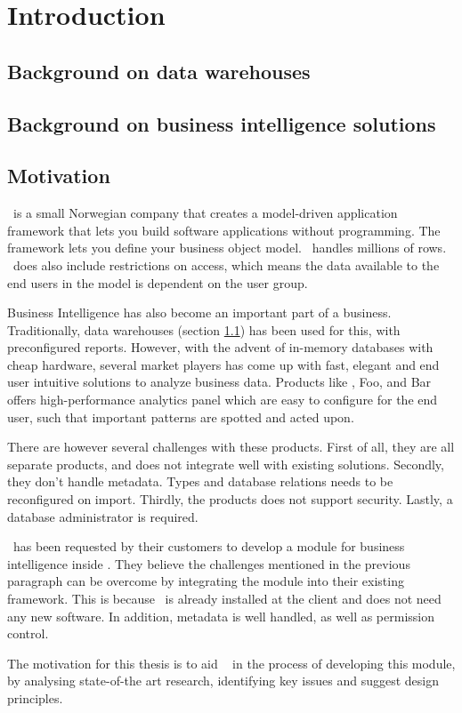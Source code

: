 \chapter{Introduction}
\label{chap:introduction}

\section{Background on data warehouses}
\label{sec:background-data-warehouses}
\lipsum[3]

\section{Background on business intelligence solutions}
\lipsum[3]

\section{Motivation}
\genus~is a small Norwegian company that creates a model-driven application framework that lets you build software applications without programming. The framework lets you define your business object model. \genusSoftware~handles millions of rows. \genusSoftware~does also include restrictions on access, which means the data available to the end users in the model is dependent on the user group.

Business Intelligence has also become an important part of a business. Traditionally, data warehouses (section \ref{sec:background-data-warehouses}) has been used for this, with preconfigured reports. However, with the advent of in-memory databases with cheap hardware, several market players has come up with fast, elegant and end user intuitive solutions to analyze business data. Products like \qlikview, Foo, and Bar offers high-performance analytics panel which are easy to configure for the end user, such that important patterns are spotted and acted upon.

There are however several challenges with these products. First of all, they are all separate products, and does not integrate well with existing solutions. Secondly, they don't handle metadata. Types and database relations needs to be reconfigured on import. Thirdly, the products does not support security. Lastly, a database administrator is required.

\genus~has been requested by their customers to develop a module for business intelligence inside \genusSoftware . They believe the challenges mentioned in the previous paragraph can be overcome by integrating the module into their existing framework. This is because \genusSoftware~is already installed at the client and does not need any new software. In addition, metadata is well handled, as well as permission control. 

The motivation for this thesis is to aid \genus~ in the process of developing this module, by analysing state-of-the art research, identifying key issues and suggest design principles.
%

